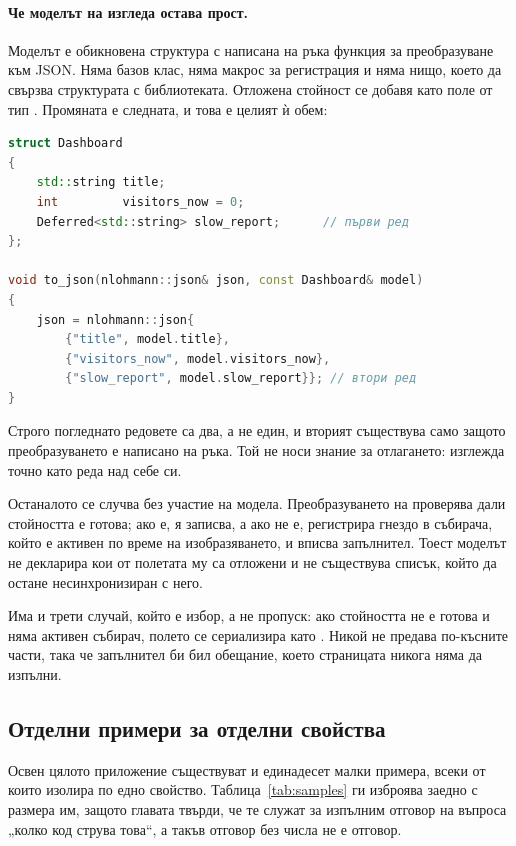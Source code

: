 \paragraph{Че моделът на изгледа остава прост.} Моделът е обикновена структура с написана
на ръка функция за преобразуване към JSON. Няма базов клас, няма макрос за регистрация и
няма нищо, което да свързва структурата с библиотеката. Отложена стойност се добавя като
поле от тип . Промяната е следната, и това е целият ѝ обем:

\begin{lstlisting}[language=C++,caption={Пълната промяна при добавяне на отложено поле},label={lst:app-deferred}]
struct Dashboard
{
    std::string title;
    int         visitors_now = 0;
    Deferred<std::string> slow_report;      // първи ред
};

void to_json(nlohmann::json& json, const Dashboard& model)
{
    json = nlohmann::json{
        {"title", model.title},
        {"visitors_now", model.visitors_now},
        {"slow_report", model.slow_report}}; // втори ред
}
\end{lstlisting}

Строго погледнато редовете са два, а не един, и вторият съществува само защото
преобразуването е написано на ръка. Той не носи знание за отлагането: изглежда точно като
реда над себе си.

Останалото се случва без участие на модела. Преобразуването на  проверява
дали стойността е готова; ако е, я записва, а ако не е, регистрира гнездо в събирача, който
е активен по време на изобразяването, и вписва запълнител. Тоест моделът не декларира кои
от полетата му са отложени и не съществува списък, който да остане несинхронизиран с него.

Има и трети случай, който е избор, а не пропуск: ако стойността не е готова и няма активен
събирач, полето се сериализира като . Никой не предава по-късните части, така че
запълнител би бил обещание, което страницата никога няма да изпълни.

\subsection{Отделни примери за отделни свойства}

Освен цялото приложение съществуват и единадесет малки примера, всеки от които изолира по
едно свойство. Таблица~\ref{tab:samples} ги изброява заедно с размера им, защото главата
твърди, че те служат за изпълним отговор на въпроса „колко код струва това“, а такъв
отговор без числа не е отговор.

